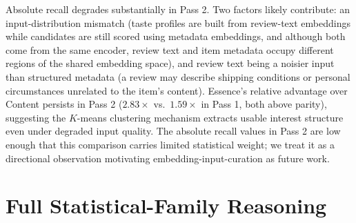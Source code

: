 \documentclass{article}
\begin{document}
Absolute recall degrades substantially in Pass 2. Two factors likely contribute: an input-distribution mismatch (taste profiles are built from review-text embeddings while candidates are still scored using metadata embeddings, and although both come from the same encoder, review text and item metadata occupy different regions of the shared embedding space), and review text being a noisier input than structured metadata (a review may describe shipping conditions or personal circumstances unrelated to the item's content). Essence's relative advantage over Content persists in Pass 2 ($2.83\times$ vs.\ $1.59\times$ in Pass 1, both above parity), suggesting the $K$-means clustering mechanism extracts usable interest structure even under degraded input quality. The absolute recall values in Pass 2 are low enough that this comparison carries limited statistical weight; we treat it as a directional observation motivating embedding-input-curation as future work.

\section{Full Statistical-Family Reasoning}
\label{app:fdr}
\end{document}
